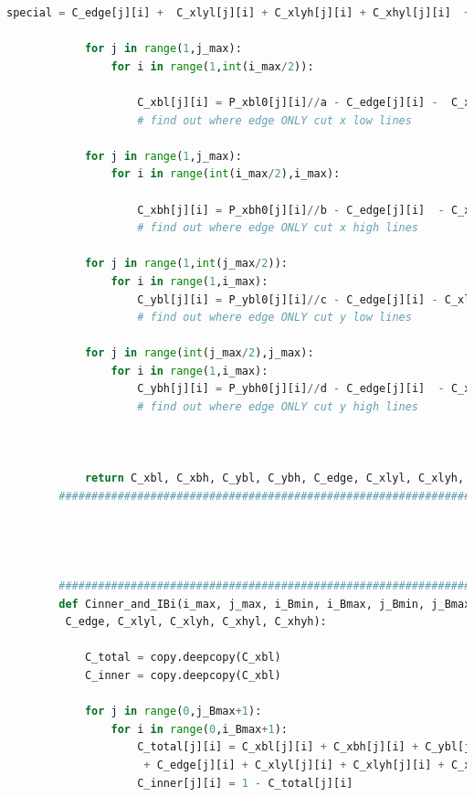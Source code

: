 \documentclass[12pt]{article}
\begin{document}
\begin{scriptsize}
\begin{lstlisting}[language=python,caption={Python code-Potential Flow}]
                    special = C_edge[j][i] +  C_xlyl[j][i] + C_xlyh[j][i] + C_xhyl[j][i]  + C_xhyh[j][i]
                
            for j in range(1,j_max):
                for i in range(1,int(i_max/2)):
        
                    C_xbl[j][i] = P_xbl0[j][i]//a - C_edge[j][i] -  C_xlyl[j][i] - C_xlyh[j][i] 
                    # find out where edge ONLY cut x low lines 
            
            for j in range(1,j_max):
                for i in range(int(i_max/2),i_max):
        
                    C_xbh[j][i] = P_xbh0[j][i]//b - C_edge[j][i]  - C_xhyl[j][i] - C_xhyh[j][i] 
                    # find out where edge ONLY cut x high lines 
        
            for j in range(1,int(j_max/2)):
                for i in range(1,i_max):
                    C_ybl[j][i] = P_ybl0[j][i]//c - C_edge[j][i] - C_xlyl[j][i]  - C_xhyl[j][i] 
                    # find out where edge ONLY cut y low lines
        
            for j in range(int(j_max/2),j_max):
                for i in range(1,i_max):
                    C_ybh[j][i] = P_ybh0[j][i]//d - C_edge[j][i]  - C_xlyh[j][i]  - C_xhyh[j][i] 
                    # find out where edge ONLY cut y high lines 
        
            
        
            return C_xbl, C_xbh, C_ybl, C_ybh, C_edge, C_xlyl, C_xlyh, C_xhyl, C_xhyh
        ##########################################################################################
        
        
        
        
        ##########################################################################################
        def Cinner_and_IBi(i_max, j_max, i_Bmin, i_Bmax, j_Bmin, j_Bmax, C_xbl, C_xbh, C_ybl, C_ybh,\ 
         C_edge, C_xlyl, C_xlyh, C_xhyl, C_xhyh):
        
            C_total = copy.deepcopy(C_xbl)
            C_inner = copy.deepcopy(C_xbl)
        
            for j in range(0,j_Bmax+1):
                for i in range(0,i_Bmax+1):
                    C_total[j][i] = C_xbl[j][i] + C_xbh[j][i] + C_ybl[j][i] + C_ybh[j][i]\ 
                     + C_edge[j][i] + C_xlyl[j][i] + C_xlyh[j][i] + C_xhyl[j][i] + C_xhyh[j][i]
                    C_inner[j][i] = 1 - C_total[j][i]
        

\end{lstlisting}
\end{scriptsize}
\end{document}
